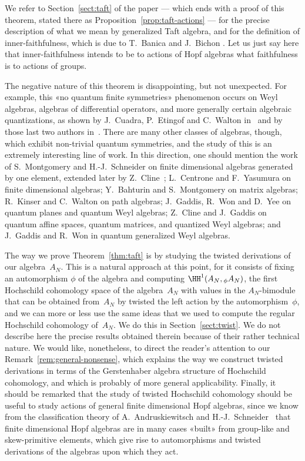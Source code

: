 We refer to Section~\ref{sect:taft} of the paper --- which ends with a proof of this
theorem, stated there as Proposition~\ref{prop:taft-actions} --- for the
precise description of what we mean by generalized Taft algebra, and for the
definition of inner-faithfulness, which is due to T.~Banica and J.~Bichon \cite{BB}.
Let us just say here that inner-faithfulness intends to be to actions of
Hopf algebras what faithfulness is to actions of groups.

The negative nature of this theorem is disappointing, but not
unexpected. For example, this «no quantum finite symmetries» phenomenon
occurs on Weyl algebras, algebras of differential operators, and more
generally certain algebraic quantizations, as shown by J.~Cuadra,
P.~Etingof and C.~Walton in~ and by
those last two authors in~\cite{EW}. There are many other classes of
algebras, though, which exhibit non-trivial quantum symmetries, and the
study of this is an extremely interesting line of work. In this direction,
one should mention the work of S.~Montgomery and H.-J.~Schneider \cite{MS}
on finite dimensional algebras generated by one element, extended
later by Z.~Cline~\cite{Cline}; L.~Centrone and F.~Yasumura \cite{CY} on
finite dimensional algebras; Y.~Bahturin and S.~Montgomery \cite{BM} on
matrix algebras; R.~Kinser and C.~Walton \cite{KW} on path algebras;
J.~Gaddis, R.~Won and D.~Yee \cite{GWY} on quantum planes and quantum Weyl
algebras; Z.~Cline and J.~Gaddis \cite{CG} on quantum affine spaces,
quantum matrices, and quantized Weyl algebras; and J.~Gaddis and R.~Won
\cite{GW} in quantum generalized Weyl algebras.

The way we prove Theorem~\ref{thm:taft} is by studying the twisted
derivations of our algebra~$A_N$. This is a natural approach at this point,
for it consists of fixing an automorphism $\phi$ of the algebra and
computing $\HH^1(A_N,{}_\phi A_N)$, the first Hochschild cohomology space
of the algebra~$A_N$ with values in the $A_N$-bimodule that can be obtained
from~$A_N$ by twisted the left action by the automorphism~$\phi$, and we
can more or less use the same ideas that we used to compute the regular
Hochschild cohomology of~$A_N$. We do this in Section~\ref{sect:twist}. We
do not describe here the precise results obtained therein because of their
rather technical nature. We would like, nonetheless, to direct the reader's
attention to our Remark~\ref{rem:general-nonsense}, which explains the way
we construct twisted derivations in terms of the Gerstenhaber algebra structure
of Hochschild cohomology, and which is probably of more general applicability.
Finally, it should be remarked that the study of twisted Hochschild
cohomology should be useful to study actions of general finite dimensional
Hopf algebras, since we know from the classification theory of
A.~Andruskiewitsch and H.-J.~Schneider~\cite{ASch}  that finite dimensional
Hopf algebras are in many cases «built» from group-like and skew-primitive
elements, which give rise to automorphisms and twisted derivations of the
algebras upon which they act.

